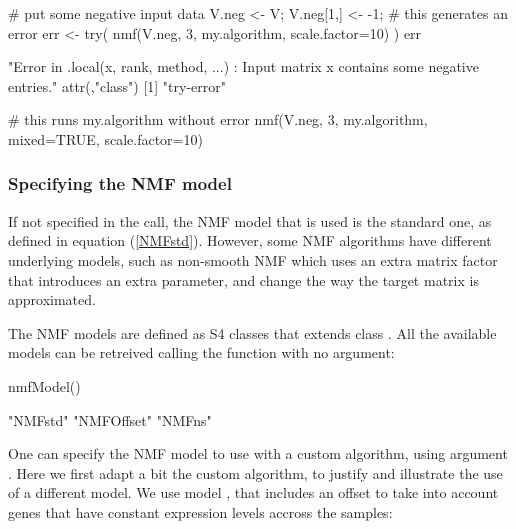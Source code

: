 \documentclass[a4paper]{article}
\newcommand{\refeqn}[1]{(\ref{#1})}
\begin{document}
\begin{Schunk}
\begin{Sinput}
 # put some negative input data 
 V.neg <- V; V.neg[1,] <- -1;
 # this generates an error
 err <- try( nmf(V.neg, 3, my.algorithm, scale.factor=10) )
 err
\end{Sinput}
\begin{Soutput}
[1] "Error in .local(x, rank, method, ...) : \n  Input matrix x contains some negative entries.\n"
attr(,"class")
[1] "try-error"
\end{Soutput}
\begin{Sinput}
 # this runs my.algorithm without error
 nmf(V.neg, 3, my.algorithm, mixed=TRUE, scale.factor=10)
\end{Sinput}
\end{Schunk}

\subsubsection{Specifying the NMF model}
If not specified in the call, the NMF model that is used is the standard one, 
as defined in equation \refeqn{NMFstd}. However, some NMF algorithms have different 
underlying models, such as non-smooth NMF \cite{nsNMF2006} which uses an extra matrix factor 
that introduces an extra parameter, and change the way the target matrix is 
approximated.

The NMF models are defined as S4 classes that extends class . All the 
available models can be retreived calling the  function with no 
argument:

\begin{Schunk}
\begin{Sinput}
 nmfModel()
\end{Sinput}
\begin{Soutput}
[1] "NMFstd"    "NMFOffset" "NMFns"    
\end{Soutput}
\end{Schunk}
 
One can specify the NMF model to use with a custom algorithm, using argument 
. Here we first adapt a bit the custom algorithm, to justify and 
illustrate the use of a different model.
We use model  \cite{Badea2008}, that includes an offset to 
take into account genes that have constant expression levels accross the samples:
\end{document}
